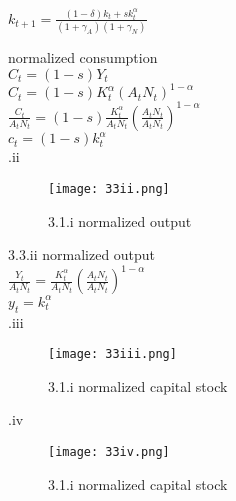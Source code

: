 \documentclass[12pt]{article}
\numberwithin{equation}{subsection} %
\begin{document}
$k_{t+1}=\frac{(1-\delta)k_{t}+sk_{t}^{\alpha}}{(1+\gamma_{A})(1+\gamma_{N})}$

normalized consumption\\
$C_{t}=(1-s)Y_{t}$\\
$C_{t}=(1-s)K_{t}^{\alpha}(A_{t}N_{t})^{1-\alpha}$\\

$\frac{C_{t}}{A_{t}N_{t}}=(1-s)\frac{K_{t}^{\alpha}}{A_{t}N_{t}}(\frac{A_{t}N_{t}}{A_{t}N_{t}})^{1-\alpha}$\\
$c_{t}=(1-s)k_{t}^{\alpha}$\\
.ii\\
\begin{figure}[ht!]
\centering
\texttt{[image: 33ii.png]}
\caption{3.1.i  normalized output \label{overflow}}
\end{figure}


3.3.ii
normalized output\\
$\frac{Y_{t}}{A_{t}N_{t}}=\frac{K_{t}^{\alpha}}{A_{t}N_{t}}(\frac{A_{t}N_{t}}{A_{t}N_{t}})^{1-\alpha}$\\
$y_{t}=k_{t}^{\alpha}$\\

.iii\\
\begin{figure}[ht!]
\centering
\texttt{[image: 33iii.png]}
\caption{3.1.i  normalized capital stock\label{overflow}}
\end{figure}


.iv\\
\begin{figure}[ht!]
\centering
\texttt{[image: 33iv.png]}
\caption{3.1.i  normalized capital stock\label{overflow}}
\end{figure}

\cleardoublepage





\end{document}
